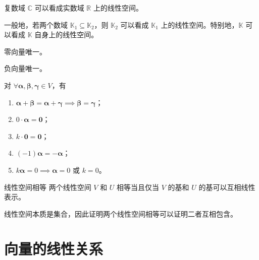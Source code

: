 \hfill

\begin{example}
  复数域 $\mathbb{C}$ 可以看成实数域 $\mathbb{R}$ 上的线性空间。
\end{example}

\begin{remark}
  一般地，若两个数域 $\mathbb{K}_1 \subseteq \mathbb{K}_2$，则 $\mathbb{K}_2$ 可以看成 $\mathbb{K}_1$ 上的线性空间。特别地，$\mathbb{K}$ 可以看成 $\mathbb{K}$ 自身上的线性空间。
\end{remark}

\begin{proposition}
  零向量唯一。
\end{proposition}

\begin{proposition}
  负向量唯一。
\end{proposition}

\begin{proposition}
  对 $\forall \bm{\alpha},\bm{\beta},\bm{\gamma} \in V$，有
  \begin{enumerate}
    \item $\bm{\alpha} + \bm{\beta} = \bm{\alpha} + \bm{\gamma} \implies \bm{\beta} = \bm{\gamma}$；
    \item $0\cdot\bm{\alpha} = \bm{0}$；
    \item $k\cdot\bm{0} = \bm{0}$；
    \item $(-1)\bm{\alpha} = -\bm{\alpha}$；
    \item $k\bm{\alpha} = 0 \implies \bm{\alpha} = 0$ 或 $k = 0$。
  \end{enumerate}
\end{proposition}

\begin{proposition}{线性空间相等}
  两个线性空间 $V$ 和 $U$ 相等当且仅当 $V$ 的基和 $U$ 的基可以互相线性表示。
\end{proposition}

\begin{remark}
  线性空间本质是集合，因此证明两个线性空间相等可以证明二者互相包含。
\end{remark}




\section{向量的线性关系}






